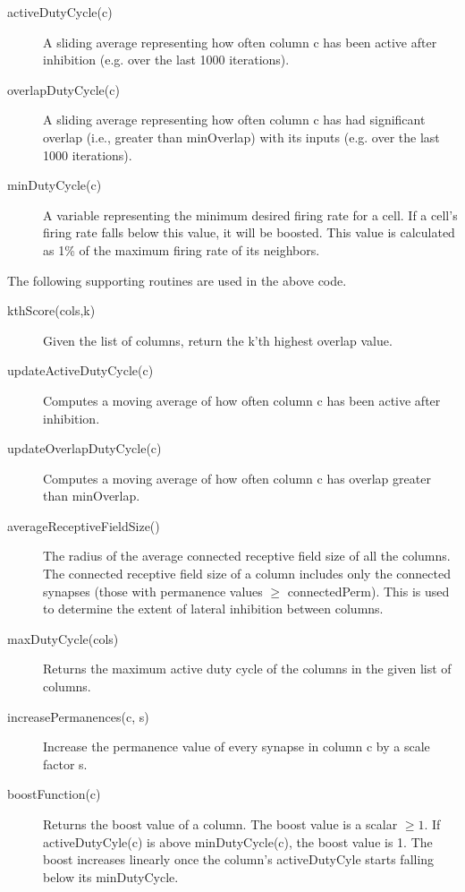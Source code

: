 \documentclass{report}
\begin{document}
\begin{description}
\item[activeDutyCycle(c)] A sliding average representing how often
  column c has been active after inhibition (e.g. over the last 1000
  iterations).
\item[overlapDutyCycle(c)] A sliding average representing how often
  column c has had significant overlap (i.e., greater than minOverlap)
  with its inputs (e.g. over the last 1000 iterations).
\item[minDutyCycle(c)] A variable representing the minimum desired
  firing rate for a cell. If a cell's firing rate falls below this
  value, it will be boosted. This value is calculated as 1\% of the
  maximum firing rate of its neighbors.
\end{description}

The following supporting routines are used in the above code.

\begin{description}
\item[kthScore(cols,k)] Given the list of columns, return the k'th
  highest overlap value.

\item[updateActiveDutyCycle(c)] Computes a moving average of how often
  column c has been active after inhibition.

\item[updateOverlapDutyCycle(c)] Computes a moving average of how
  often column c has overlap greater than minOverlap.

\item[averageReceptiveFieldSize()] The radius of the average connected
  receptive field size of all the columns. The connected receptive
  field size of a column includes only the connected synapses (those
  with permanence values $\ge$ connectedPerm). This is used to determine
  the extent of lateral inhibition between columns.

\item[maxDutyCycle(cols)] Returns the maximum active duty cycle of the
  columns in the given list of columns.

\item[increasePermanences(c, s)] Increase the permanence value of
  every synapse in column c by a scale factor s.

\item[boostFunction(c)] Returns the boost value of a column. The boost
  value is a scalar $\ge 1$. If activeDutyCyle(c) is above
  minDutyCycle(c), the boost value is 1. The boost increases linearly
  once the column's activeDutyCyle starts falling below its
  minDutyCycle.
\end{description}
\end{document}
